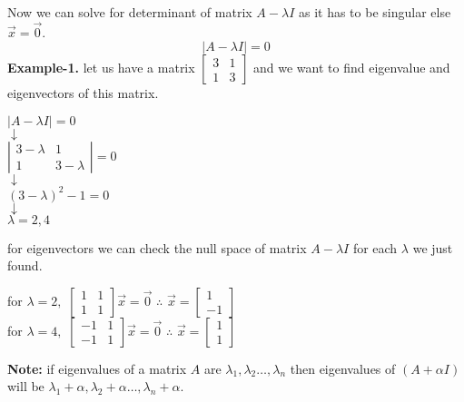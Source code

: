 \documentclass[a4paper,11pt]{article}
\numberwithin{equation}{section}
\begin{document}
\begin{itemize}
Now we can solve for determinant of matrix $A-\lambda I$ as it has to be singular else $\vec{x}=\vec{0}$.
\begin{equation}
    \left|A-\lambda I\right|=0 \tag{Charactorstic Equation}
\end{equation}
\textbf{Example-1.} let us have a matrix $\begin{bmatrix}3&1\\1&3\end{bmatrix}$ and we want to find eigenvalue and eigenvectors of this matrix.

\begin{center}
    $\left| A-\lambda I\right|=0$\\
    $\downarrow$\\
    $\left|\begin{matrix}
        3-\lambda&1\\1&3-\lambda
    \end{matrix}\right|=0$\\
    $\downarrow$\\
    $(3-\lambda)^2-1=0$\\
    $\downarrow$\\
    $\lambda=2,4$
\end{center}

for eigenvectors we can check the null space of matrix $A-\lambda I$ for each $\lambda$ we just found.
\begin{center}
    for $\lambda =2,$ $\begin{bmatrix}
        1&1\\1&1
    \end{bmatrix}\vec{x}=\vec{0}$ \hspace{6pt} $\therefore$ $\vec{x}=\begin{bmatrix}
        1\\-1
    \end{bmatrix}$\\
    \vspace{10pt}
    for $\lambda =4,$ $\begin{bmatrix}
        -1&1\\-1&1
    \end{bmatrix}\vec{x}=\vec{0}$ \hspace{6pt} $\therefore$ $\vec{x}=\begin{bmatrix}
        1\\1
    \end{bmatrix}$
\end{center}
\textbf{Note: }if eigenvalues of a matrix $A$ are $\lambda_1,\lambda_2\dots,\lambda_n$ then eigenvalues of $(A+\alpha I)$ will be $\lambda_1+\alpha,\lambda_2+\alpha\dots,\lambda_n+\alpha$. \\


\end{itemize}
\end{document}
